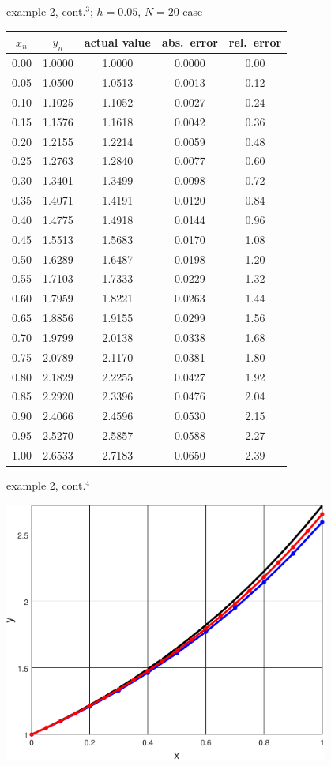 \documentclass{beamer}
\begin{document}
\begin{frame}{example 2, cont.$^3$; $h=0.05$, $N=20$ case}

\scriptsize
\begin{tabular}{ccccc}
$x_n$ & $y_n$ & actual value & abs.~error & rel.~error \\ \hline
0.00 & 1.0000 & 1.0000 & 0.0000 & 0.00 \\
0.05 & 1.0500 & 1.0513 & 0.0013 & 0.12 \\
0.10 & 1.1025 & 1.1052 & 0.0027 & 0.24 \\
0.15 & 1.1576 & 1.1618 & 0.0042 & 0.36 \\
0.20 & 1.2155 & 1.2214 & 0.0059 & 0.48 \\
0.25 & 1.2763 & 1.2840 & 0.0077 & 0.60 \\
0.30 & 1.3401 & 1.3499 & 0.0098 & 0.72 \\
0.35 & 1.4071 & 1.4191 & 0.0120 & 0.84 \\
0.40 & 1.4775 & 1.4918 & 0.0144 & 0.96 \\
0.45 & 1.5513 & 1.5683 & 0.0170 & 1.08 \\
0.50 & 1.6289 & 1.6487 & 0.0198 & 1.20 \\
0.55 & 1.7103 & 1.7333 & 0.0229 & 1.32 \\
0.60 & 1.7959 & 1.8221 & 0.0263 & 1.44 \\
0.65 & 1.8856 & 1.9155 & 0.0299 & 1.56 \\
0.70 & 1.9799 & 2.0138 & 0.0338 & 1.68 \\
0.75 & 2.0789 & 2.1170 & 0.0381 & 1.80 \\
0.80 & 2.1829 & 2.2255 & 0.0427 & 1.92 \\
0.85 & 2.2920 & 2.3396 & 0.0476 & 2.04 \\
0.90 & 2.4066 & 2.4596 & 0.0530 & 2.15 \\
0.95 & 2.5270 & 2.5857 & 0.0588 & 2.27 \\
1.00 & 2.6533 & 2.7183 & 0.0650 & 2.39
\end{tabular}
\end{frame}


\begin{frame}{example 2, cont.$^4$}

\begin{center}
\includegraphics[width=0.8\textwidth]{figs/simpleeuler}
\end{center}
\end{frame}
\end{document}
